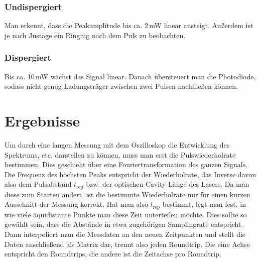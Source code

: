 \documentclass[bachelor,       %
               twoside,        %
               BCOR10mm,       %
               english,ngerman, %
               ]{GAUBM}
\begin{document}
\subsection{Undispergiert}
Man erkennt, dass die Peakamplitude bis ca. 2\,mW linear ansteigt.
Außerdem ist je nach Justage ein Ringing nach dem Puls zu beobachten.

\subsection{Dispergiert}
Bis ca. 10\,mW wächst das Signal linear.
Danach übersteuert man die Photodiode, sodass nicht genug Ladungsträger zwischen zwei Pulsen nachfließen können.

\chapter{Ergebnisse}
Um durch eine langen Messung mit dem Oszilloskop die Entwicklung des Spektrums, etc. darstellen zu können, muss man erst die Pulswiederholrate bestimmen.
Dies geschieht über eine Fouriertransformation des ganzen Signals.
Die Frequenz des höchsten Peaks entspricht der Wiederholrate, das Inverse davon also dem Pulsabstand $t_\text{rep}$ bzw. der optischen Cavity-Länge des Lasers.
Da man diese zum Starten ändert, ist die bestimmte Wiederholrate nur für einen kurzen Ausschnitt der Messung korrekt.
Hat man also $t_\text{rep}$ bestimmt, legt man fest, in wie viele äquidistante Punkte man diese Zeit unterteilen möchte.
Dies sollte so gewählt sein, dass die Abstände in etwa zugehörigen Samplingrate entspricht.
Dann interpoliert man die Messdaten an den neuen Zeitpunkten und stellt die Daten anschließend als Matrix dar, trennt also jeden Roundtrip.
Die eine Achse entspricht den Roundtrips, die andere ist die Zeitachse pro Roundtrip.
\end{document}
